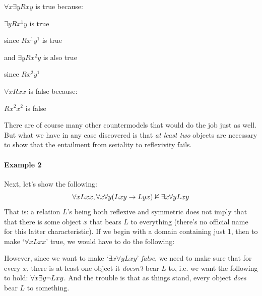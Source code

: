 \begin{ebullet}
\item $\forall x \exists y Rxy$ is true because:
\begin{etriangle}
\item $\exists yRx^1y$ is true
\begin{etriangle}
\item since $Rx^1y^1$ is true
\end{etriangle}
\item and $\exists yRx^2y$ is also true
\begin{etriangle}
\item since $Rx^2y^1$
\end{etriangle}
\end{etriangle}
\end{ebullet}

\begin{ebullet}
\item $\forall xRxx$ is false because:
\begin{etriangle}
\item $Rx^2x^2$ is false
\end{etriangle}
\end{ebullet}

There are of course many other countermodels that would do the job just as well.  But what we have in any case discovered is that \emph{at least two} objects are necessary to show that the entailment from seriality to reflexivity fails.

\paragraph{Example 2} Next, let's show the following:
$$\forall x Lxx, \forall x\forall y(Lxy \rightarrow Lyx) \nvDash \exists x\forall yLxy$$
That is: a relation $L$'s being both reflexive and symmetric does not imply that that there is some object $x$ that bears $L$ to everything (there's no official name for this latter characteristic).  If we begin with a domain containing just 1, then to make `$\forall xLxx$' true, we would have to do the following:
\begin{center}\end{center}
However, since we want to make `$\exists x\forall yLxy$' \emph{false}, we need to make sure that for every $x$, there is at least one object it \emph{doesn't} bear $L$ to, i.e. we want the following to hold: $\forall x \exists y \neg Lxy$.  And the trouble is that as things stand, every object \emph{does} bear $L$ to something.

